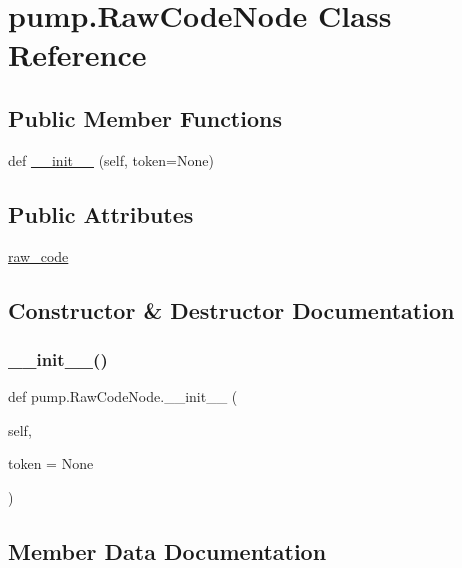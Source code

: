 \hypertarget{classpump_1_1RawCodeNode}{}\section{pump.\+Raw\+Code\+Node Class Reference}
\label{classpump_1_1RawCodeNode}
\subsection*{Public Member Functions}
\begin{DoxyCompactItemize}
\item 
def \mbox{\hyperlink{classpump_1_1RawCodeNode_a7ba81f4da42d4e96a89713032867f87f}{\+\_\+\+\_\+init\+\_\+\+\_\+}} (self, token=None)
\end{DoxyCompactItemize}
\subsection*{Public Attributes}
\begin{DoxyCompactItemize}
\item 
\mbox{\hyperlink{classpump_1_1RawCodeNode_ab36224d959e0d8f803e9fac8e6a0baab}{raw\+\_\+code}}
\end{DoxyCompactItemize}


\subsection{Constructor \& Destructor Documentation}
\mbox{\label{classpump_1_1RawCodeNode_a7ba81f4da42d4e96a89713032867f87f}} 
\subsubsection{\texorpdfstring{\_\_init\_\_()}{\_\_init\_\_()}}
{\footnotesize\ttfamily def pump.\+Raw\+Code\+Node.\+\_\+\+\_\+init\+\_\+\+\_\+ (\begin{DoxyParamCaption}\item[{}]{self,  }\item[{}]{token = {\ttfamily None} }\end{DoxyParamCaption})}



\subsection{Member Data Documentation}
\mbox{\label{classpump_1_1RawCodeNode_ab36224d959e0d8f803e9fac8e6a0baab}} 
